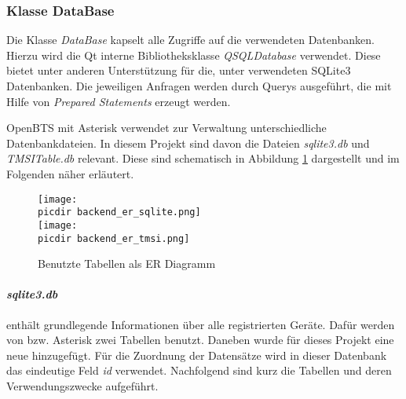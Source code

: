 \subsubsection*{Klasse DataBase}

Die Klasse \textit{DataBase} kapselt alle Zugriffe auf die verwendeten Datenbanken. Hierzu wird die Qt interne Bibliotheksklasse \textit{QSQLDatabase} verwendet. Diese bietet unter anderen Unterstützung für die, unter \OpenBTS verwendeten SQLite3 Datenbanken. Die jeweiligen Anfragen werden durch \SQL Querys ausgeführt, die mit Hilfe von \textit{Prepared Statements} erzeugt werden.

OpenBTS mit Asterisk verwendet zur Verwaltung unterschiedliche Datenbankdateien. In diesem Projekt sind davon die Dateien \textit{sqlite3.db} und \textit{TMSITable.db} relevant. Diese sind schematisch in Abbildung \ref{fig:database_er} dargestellt und im Folgenden näher erläutert.

\begin{figure}[h!]
	\centering
	\texttt{[image: \\picdir backend\_er\_sqlite.png]} \\
	\texttt{[image: \\picdir backend\_er\_tmsi.png]}
	\caption{Benutzte Tabellen als ER Diagramm}
	\label{fig:database_er}
\end{figure}


\paragraph{\textit{sqlite3.db}} enthält grundlegende Informationen über alle registrierten Geräte. Dafür werden von \OpenBTS bzw. Asterisk zwei Tabellen benutzt. Daneben wurde für dieses Projekt eine neue hinzugefügt. Für die Zuordnung der Datensätze wird in dieser Datenbank das eindeutige Feld \textit{id} verwendet. Nachfolgend sind kurz die Tabellen und deren Verwendungszwecke aufgeführt.

